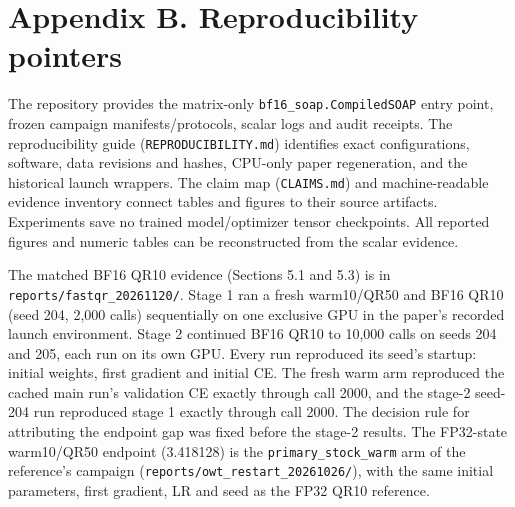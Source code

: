 \hypertarget{appendix-b.-reproducibility-pointers}{%
\section{Appendix B. Reproducibility
pointers}\label{appendix-b.-reproducibility-pointers}}

The repository provides the matrix-only \texttt{bf16\_soap.CompiledSOAP}
entry point, frozen campaign manifests/protocols, scalar logs and audit
receipts. The reproducibility guide (\texttt{REPRODUCIBILITY.md})
identifies exact configurations, software, data revisions and hashes,
CPU-only paper regeneration, and the historical launch wrappers. The
claim map (\texttt{CLAIMS.md}) and machine-readable evidence inventory
connect tables and figures to their source artifacts. Experiments save
no trained model/optimizer tensor checkpoints. All reported figures and
numeric tables can be reconstructed from the scalar evidence.

The matched BF16 QR10 evidence (Sections 5.1 and 5.3) is in
\texttt{reports/fastqr\_20261120/}. Stage 1 ran a fresh warm10/QR50
and BF16 QR10 (seed 204, 2,000 calls) sequentially on one exclusive GPU
in the paper's recorded launch environment. Stage 2 continued BF16 QR10
to 10,000 calls on seeds 204 and 205, each run on its own GPU. Every
run reproduced its seed's startup: initial weights, first gradient and
initial CE. The fresh warm arm reproduced the cached main run's
validation CE exactly through call 2000, and the stage-2 seed-204 run
reproduced stage 1 exactly through call 2000. The decision rule for
attributing the endpoint gap was fixed before the stage-2 results. The
FP32-state warm10/QR50 endpoint (3.418128) is the
\texttt{primary\_stock\_warm} arm of the reference's campaign
(\texttt{reports/owt\_restart\_20261026/}), with the same initial
parameters, first gradient, LR and seed as the FP32 QR10 reference.
